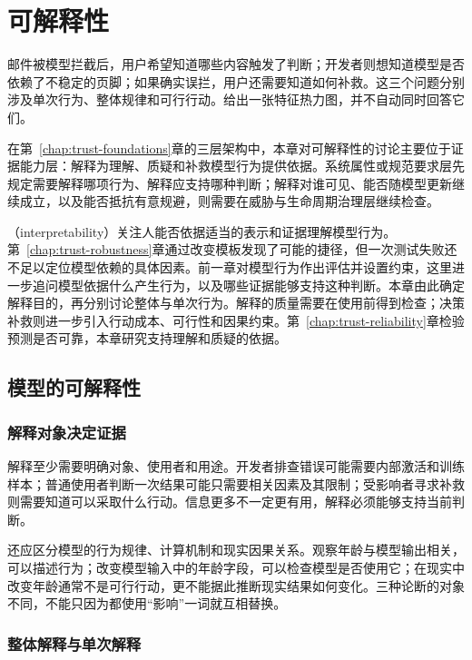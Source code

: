 \chapter{可解释性}
\label{chap:trust-interpretability}

邮件被模型拦截后，用户希望知道哪些内容触发了判断；开发者则想知道模型是否依赖了不稳定的页脚；如果确实误拦，用户还需要知道如何补救。这三个问题分别涉及单次行为、整体规律和可行行动。给出一张特征热力图，并不自动同时回答它们。

在第~\ref{chap:trust-foundations}章的三层架构中，本章对可解释性的讨论主要位于证据能力层：解释为理解、质疑和补救模型行为提供依据。系统属性或规范要求层先规定需要解释哪项行为、解释应支持哪种判断；解释对谁可见、能否随模型更新继续成立，以及能否抵抗有意规避，则需要在威胁与生命周期治理层继续检查。

（interpretability）关注人能否依据适当的表示和证据理解模型行为。第~\ref{chap:trust-robustness}章通过改变模板发现了可能的捷径，但一次测试失败还不足以定位模型依赖的具体因素。前一章对模型行为作出评估并设置约束，这里进一步追问模型依据什么产生行为，以及哪些证据能够支持这种判断。本章由此确定解释目的，再分别讨论整体与单次行为。解释的质量需要在使用前得到检查；决策补救则进一步引入行动成本、可行性和因果约束。第~\ref{chap:trust-reliability}章检验预测是否可靠，本章研究支持理解和质疑的依据。

\section{模型的可解释性}
\label{sec:interpretability-purpose}

\subsection{解释对象决定证据}

解释至少需要明确对象、使用者和用途。开发者排查错误可能需要内部激活和训练样本；普通使用者判断一次结果可能只需要相关因素及其限制；受影响者寻求补救则需要知道可以采取什么行动。信息更多不一定更有用，解释必须能够支持当前判断。

还应区分模型的行为规律、计算机制和现实因果关系。观察年龄与模型输出相关，可以描述行为；改变模型输入中的年龄字段，可以检查模型是否使用它；在现实中改变年龄通常不是可行行动，更不能据此推断现实结果如何变化。三种论断的对象不同，不能只因为都使用“影响”一词就互相替换。

\subsection{整体解释与单次解释}
\label{sec:interpretability-global-local}

